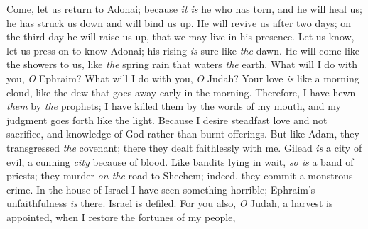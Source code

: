 \begin{biblechapter} %
 Come, let us return to Adonai; 
because \textit{it is} he who has torn, and he will heal us; 
he has struck us down and will bind us up.
\verse He will revive us after two days; 
on the third day he will raise us up, 
that we may live in his presence.
\verse Let us know, let us press on to know Adonai; 
his rising \textit{is} sure like \textit{the} dawn. 
He will come like the showers to us, 
like \textit{the} spring rain that waters \textit{the} earth.
\verse What will I do with you, \textit{O} Ephraim? 
What will I do with you, \textit{O} Judah? 
Your love \textit{is} like a morning cloud, 
like the dew that goes away early in the morning.
\verse Therefore, I have hewn \textit{them} by \textit{the} prophets; 
I have killed them by the words of my mouth, 
and my judgment goes forth like the light.
\verse Because I desire steadfast love and not sacrifice, 
and knowledge of God rather than burnt offerings.
\verse But like Adam, they transgressed \textit{the} covenant; 
there they dealt faithlessly with me.
\verse Gilead \textit{is} a city of evil, 
a cunning \textit{city} because of blood.
\verse Like bandits lying in wait, 
\textit{so is} a band of priests; 
they murder \textit{on the} road to Shechem; 
indeed, they commit a monstrous crime.
\verse In the house of Israel I have seen something horrible; 
Ephraim’s unfaithfulness \textit{is} there. 
Israel is defiled.
 For you also, \textit{O} Judah, a harvest is appointed, 
when I restore the fortunes of my people,
\end{biblechapter}

